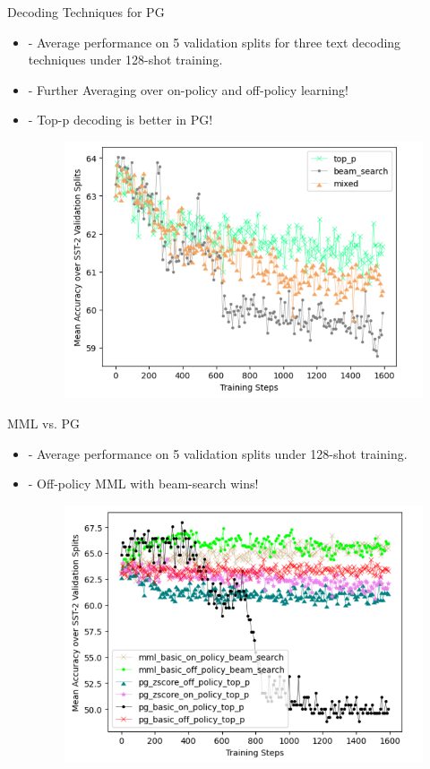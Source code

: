 \documentclass{beamer}
\begin{document}
\begin{frame}{Decoding Techniques for PG}
\begin{itemize}
        \item - Average performance on 5 validation splits for three text decoding techniques under 128-shot training.
        \medskip
        \medskip
        \item - Further Averaging over on-policy and off-policy learning!
        \medskip
        \medskip
        \item - {\color{green}Top-p decoding} is better in PG!
        \begin{figure}
        \centering
        \includegraphics[width=0.7\linewidth]{decoding_in_pg.png}
    \end{figure}
\end{itemize}
\end{frame}

\begin{frame}{MML vs. PG}
\begin{itemize}
        \item - Average performance on 5 validation splits under 128-shot training.
        \medskip
        \medskip
        \item - Off-policy MML with beam-search wins!
        \begin{figure}
        \centering
\includegraphics[width=0.7\linewidth]{comparison.png}
    \end{figure}
\end{itemize}
\end{frame}
\end{document}
